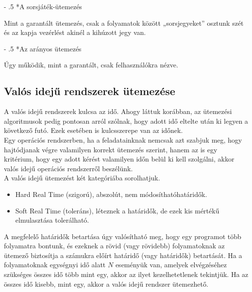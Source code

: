 \documentclass[tikz,12pt,margin=0px]{article}
\makeatletter
\renewcommand\paragraph{%
	\@startsection{paragraph}{4}{0mm}%
	{-\baselineskip}%
	{.5\baselineskip}%
	{\normalfont\normalsize\bfseries}}
\makeatother
\begin{document}
    \paragraph*{A sorsjáték-ütemezés}

    \noindent Mint a garantált ütemezés, csak a folyamatok között „sorsjegyeket” osztunk szét és az kapja vezérlést akinél a kihúzott jegy van.

    \paragraph*{Az arányos ütemezés}

    \noindent Úgy működik, mint a garantált, csak felhasználókra nézve.\\

    \subsection*{Valós idejű rendszerek ütemezése}

    A valós idejű rendszerek kulcsa az idő. Ahogy láttuk korábban, az ütemezési algoritmusok pedig pontosan arról szólnak, hogy adott idő eltelte után ki legyen a következő futó. Ezek esetében is kulcsszerepe van az időnek.\\

    \noindent Egy operációs rendszerben, ha a feladatainknak nemcsak azt szabjuk meg, hogy hajtódjanak végre valamilyen korrekt ütemezés szerint, hanem az is egy kritérium, hogy egy adott kérést valamilyen időn belül ki kell szolgálni, akkor valós idejű operációs rendszerről beszélünk.\\

    \noindent A valós idejű ütemezést két kategóriába sorolhatjuk.
	\begin{itemize}[topsep=8pt,itemsep=4pt,partopsep=4pt, parsep=4pt]
		\item Hard Real Time (szigorú), abszolút, nem módosíthatóhatáridők.
		\item Soft Real Time (toleráns), léteznek a határidők, de ezek kis mértékű elmulasztása tolerálható.
	\end{itemize}

    \noindent A megfelelő határidők betartása úgy valósítható meg, hogy egy programot több folyamatra bontunk, és ezeknek a rövid (vagy rövidebb) folyamatoknak az ütemező biztosítja a számukra előírt határidő (vagy határidők) betartását. Ha a folyamatoknak egységnyi idő alatt $N$ eseményük van, amelyek elvégzéséhez szükséges összes idő több mint egy, akkor az ilyet kezelhetetlenek tekintjük. Ha az összes idő kisebb, mint egy, akkor a valós idejű rendszer ütemezhető.
\end{document}
